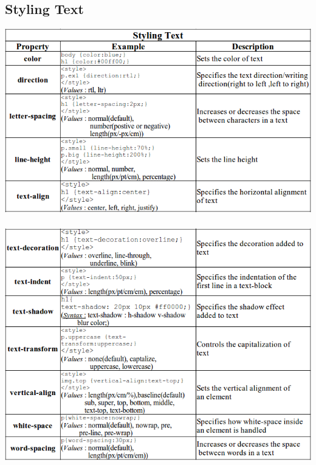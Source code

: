 \documentclass[11pt,a4paper]{article}
\begin{document}
\subsection*{Styling Text}
\begin{center}
\includegraphics[scale=0.65]{first.png}
\end{center}
\begin{center}
\includegraphics[width = 155mm,  height = 105mm]{Second.png}
\end{center}
\end{document}
